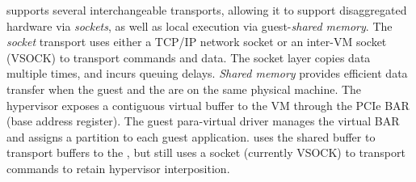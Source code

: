 \model supports several interchangeable transports, allowing it to support disaggregated hardware via \emph{sockets}, as well as local execution via guest-\worker \emph{shared memory}.
The \emph{socket} transport uses either a TCP/IP network socket or an inter-VM socket (VSOCK) to transport commands and data.
The socket layer copies data multiple times, and incurs queuing delays.
\emph{Shared memory} provides efficient data transfer when the guest and the \worker are on the same physical machine.
The hypervisor exposes a contiguous virtual buffer to the VM through the \vdev PCIe BAR (base address register).
The guest para-virtual driver manages the virtual BAR and assigns a partition to each guest application.
\Model uses the shared buffer to transport buffers to the \worker,
but still uses a socket (currently VSOCK) to transport commands to retain hypervisor interposition.

